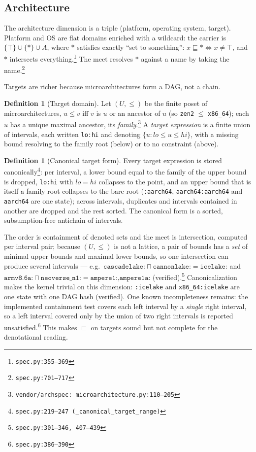 \documentclass[11pt]{article}
\theoremstyle{definition}
\newtheorem{definition}[theorem]{Definition}
\theoremstyle{remark}
\newcommand{\sat}{\sqsubseteq}
\newcommand{\meet}{\sqcap}
\newcommand{\code}[1]{\texttt{#1}}
\newcommand{\src}[1]{\footnote{\code{#1}}}
\begin{document}
\subsection{Architecture}\label{sec:arch}

The architecture dimension is a triple (platform, operating system, target).
Platform and OS are flat domains enriched with a wildcard: the carrier is
$\{\top\} \cup \{*\} \cup A$, where $*$ satisfies exactly ``set to
something'': $x \sat * \iff x \neq \top$, and $*$ intersects
everything.\src{spec.py:355--369}  The meet resolves $*$ against a name by
taking the name.\src{spec.py:701--717}

Targets are richer because microarchitectures form a DAG, not a chain.

\begin{definition}[Target domain]
Let $(U, \le)$ be the finite poset of microarchitectures, $u \le v$ iff $v$ is
$u$ or an ancestor of $u$ (so \code{zen2} $\le$ \code{x86\_64}); each $u$ has
a unique maximal ancestor, its \emph{family}.\src{vendor/archspec:
microarchitecture.py:110--205}  A \emph{target expression} is a finite union
of intervals, each written \code{lo:hi} and denoting
$\{u : \mathit{lo} \le u \le \mathit{hi}\}$, with a missing bound resolving to
the family root (below) or to no constraint (above).
\end{definition}

\begin{definition}[Canonical target form]\label{def:targetcanon}
Every target expression is stored canonically\src{spec.py:219--247
(\code{\_canonical\_target\_range})}: per interval, a lower bound equal to the
family of the upper bound is dropped, \code{lo:hi} with $lo = hi$ collapses to
the point, and an upper bound that is itself a family root collapses to the
bare root (\code{:aarch64}, \code{aarch64:aarch64} and \code{aarch64} are one
state); across intervals, duplicates and intervals contained in another are
dropped and the rest sorted.  The canonical form is a sorted,
subsumption-free antichain of intervals.
\end{definition}

The order is containment of denoted sets and the meet is intersection,
computed per interval pair; because $(U, \le)$ is not a lattice, a pair of
bounds has a \emph{set} of minimal upper bounds and maximal lower bounds, so
one intersection can produce several intervals --- e.g.\
$\code{cascadelake:} \meet \code{cannonlake:} = \code{icelake:}$ and
$\code{armv8.6a:} \meet \code{neoverse\_n1:} =
\code{ampere1:,ampere1a:}$ (verified).\src{spec.py:301--346, 407--439}
Canonicalization makes the kernel trivial on this dimension:
\code{:icelake} and \code{x86\_64:icelake} are one state with one DAG hash
(verified).  One known incompleteness remains: the implemented containment
test covers each left interval by a \emph{single} right interval, so a left
interval covered only by the union of two right intervals is reported
unsatisfied.\src{spec.py:386--390}  This makes $\sat$ on targets sound but not
complete for the denotational reading.
\end{document}
